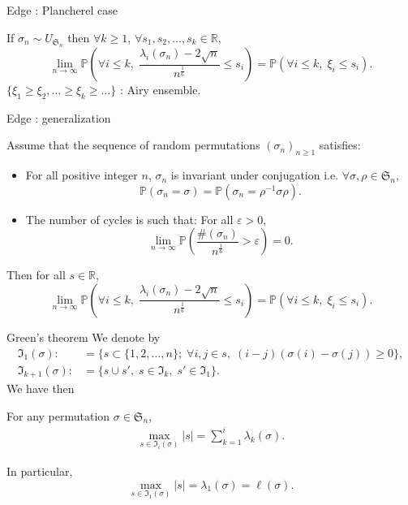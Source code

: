 \documentclass[english]{beamer}
\begin{document}
\begin{frame}{Edge : Plancherel case}
\begin{theorem} 
 If $\sigma_n \sim {U}_{\mathfrak{S}_n}$ then  $\forall k \geq 1 $,  $\forall s_1,s_2,\dots,s_k \in \mathbb{R}$,
\begin{equation*} 
\lim_{n\to \infty}\mathbb{P}\left(\forall i\leq k, \;\frac{\lambda_i(\sigma_n)-2\sqrt{n}}{n^\frac{1}{6}}\leq s_i\right)=\mathbb{P}(\forall i\leq k,\;\xi_i\leq s_i).
\end{equation*}
$\{\xi_1\geq \xi_2,\dots\geq  \xi_k \geq  \dots \}$ : Airy ensemble.
\end{theorem}

\end{frame}
\begin{frame}{Edge : generalization}
    \begin{theorem}[\cite{sk}]
Assume that the sequence of random permutations  $(\sigma_n)_{n\geq 1}$ satisfies:
\begin{itemize}
\item  For all positive integer $n$, $\sigma_n$ is invariant under conjugation i.e.  $\forall \sigma , \rho \in \mathfrak{S}_n$,
\begin{equation}\tag{H1}
\mathbb{P}(\sigma_n=\sigma)=\mathbb{P}(\sigma_n=\rho^{-1}\sigma\rho).
\end{equation}
\item The number of cycles is such that: For all $\varepsilon>0$,
\begin{equation}\tag{H2}
\lim_{n\to \infty}\mathbb{P}\left(\frac{\#(\sigma_n)}{n^\frac 16 }>\varepsilon\right) =0.
\end{equation}
\end{itemize}
Then  for all  $s \in \mathbb{R}$,
\begin{equation*} 
\lim_{n\to \infty}\mathbb{P}\left(\forall i\leq k, \;\frac{\lambda_i(\sigma_n)-2\sqrt{n}}{n^\frac{1}{6}}\leq s_i\right)=\mathbb{P}(\forall i\leq k,\;\xi_i\leq s_i).\end{equation*}
\end{theorem}
\end{frame}

\begin{frame}{Green's theorem}
    We denote by  \begin{align*}
\mathfrak{I}_1(\sigma):&=\{s\subset\{1,2,\dots,n\};\; \forall i,j \in s,\; (i-j)(\sigma(i)-\sigma(j))\geq 0 \},
\\\mathfrak{I}_{k+1}(\sigma):&=\{s\cup s',\; s\in \mathfrak{I}_k,\;s'\in \mathfrak{I}_1\}.
\end{align*}
We have then
\begin{lemma}
For any permutation $ \sigma\in \mathfrak{S}_n$,
\begin{align*}
\max_{s\in \mathfrak{I}_i(\sigma)} |s| =\sum_{k=1}^i \lambda_k(\sigma).
\end{align*}
\end{lemma}
In particular, $$\max_{s\in \mathfrak{I}_1(\sigma)} |s| =\lambda_1(\sigma)=\ell(\sigma).$$
\end{frame}
\end{document}
